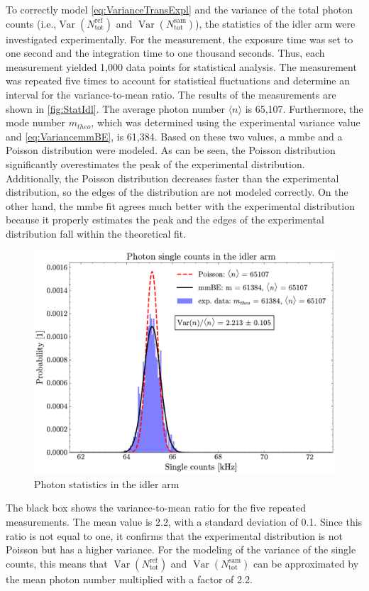 To correctly model \autoref{eq:VarianceTransExpl} and the variance of the total photon counts (i.e.,$\operatorname{Var}\!\left( N_{\text{tot}}^{\text{ref}} \right)$ and $\operatorname{Var}\!\left( N_{\text{tot}}^{\text{sam}} \right)$), the statistics of the idler arm were investigated experimentally. \newline
For the measurement, the exposure time was set to one second and the integration time to one thousand seconds. Thus, each measurement yielded 1,000 data points for statistical analysis. The measurement was repeated five times to account for statistical fluctuations and determine an interval for the variance-to-mean ratio.
The results of the measurements are shown in \autoref{fig:StatIdl}. \newline
The average photon number $\langle n\rangle$ is 65,107. Furthermore, the mode number $m_{theo}$, which was determined using the experimental variance value and \autoref{eq:VariancemmBE}, is 61,384. Based on these two values, a \acrshort{mmbe} and a Poisson distribution were modeled. As can be seen, the Poisson distribution significantly overestimates the peak of the experimental distribution. Additionally, the Poisson distribution decreases faster than the experimental distribution, so the edges of the distribution are not modeled correctly. On the other hand, the \acrshort{mmbe} fit agrees much better with the experimental distribution because it properly estimates the peak and the edges of the experimental distribution fall within the theoretical fit.
\begin{figure}[tb!]
	\centering
	\includegraphics[width=.7\textwidth]{Images/SingleStatisticsIdler.pdf}
	\caption{Photon statistics in the idler arm}
	\label{fig:StatIdl}
\end{figure}\newline
The black box shows the variance-to-mean ratio for the five repeated measurements. The mean value is 2.2, with a standard deviation of 0.1. Since this ratio is not equal to one, it confirms that the experimental distribution is not Poisson but has a higher variance. For the modeling of the variance of the single counts, this means that $\operatorname{Var}\!\left( N_{\text{tot}}^{\text{ref}} \right)$ and $\operatorname{Var}\!\left( N_{\text{tot}}^{\text{sam}} \right)$ can be approximated by the mean photon number multiplied with a factor of 2.2. \newline
